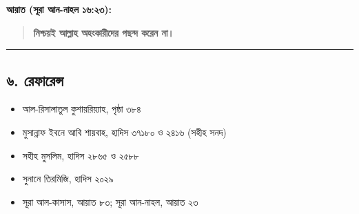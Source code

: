 \textbf{আয়াত (সূরা আন-নাহল ১৬:২৩):}
\begin{quote}
\textbf{নিশ্চয়ই আল্লাহ অহংকারীদের পছন্দ করেন না।}
\end{quote}

\medskip\hrule\medskip

\subsection*{৬. রেফারেন্স}

\begin{itemize}
\item আল-রিসালাতুল কুশায়রিয়্যাহ, পৃষ্ঠা ৩৮৪
\item মুসান্নাফ ইবনে আবি শায়বাহ, হাদিস ৩৭১৮০ ও ২৪১৬ (সহীহ সনদ)
\item সহীহ মুসলিম, হাদিস ২৮৬৫ ও ২৫৮৮
\item সুনানে তিরমিজি, হাদিস ২০২৯
\item সূরা আল-কাসাস, আয়াত ৮৩; সূরা আন-নাহল, আয়াত ২৩
\end{itemize}


